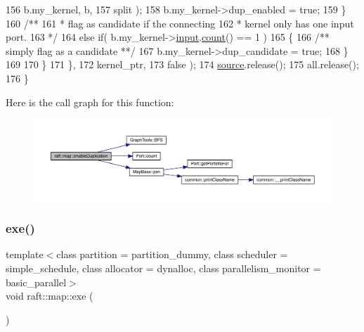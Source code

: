 \begin{DoxyCode}
156                                                b.my\_kernel, b,
157                                                split );
158                               b.my\_kernel->dup\_enabled = \textcolor{keyword}{true};
159                            \}\textcolor{comment}{}
160 \textcolor{comment}{                           /**}
161 \textcolor{comment}{                            * flag as candidate if the connecting}
162 \textcolor{comment}{                            * kernel only has one input port.}
163 \textcolor{comment}{                            */}
164                            \textcolor{keywordflow}{else} \textcolor{keywordflow}{if}( b.my\_kernel->\hyperlink{classraft_1_1kernel_a6edbe35a56409d402e719b3ac36d6554}{input}.\hyperlink{class_port_a33562ea87ac7e83a32441da40cbd9279}{count}() == 1 )
165                            \{\textcolor{comment}{}
166 \textcolor{comment}{                              /** simply flag as a candidate **/}
167                               b.my\_kernel->dup\_candidate = \textcolor{keyword}{true};
168                            \}
169 
170                         \}
171                      \},
172                      kernel\_ptr,
173                      false );
174    \hyperlink{classsource}{source}.release();
175    all.release();
176 \}
\end{DoxyCode}
Here is the call graph for this function\+:
\nopagebreak
\begin{figure}[H]
\begin{center}
\leavevmode
\includegraphics[width=350pt]{classraft_1_1map_a9eb65e50373f006fb193c203f8cab7d8_cgraph}
\end{center}
\end{figure}
\hypertarget{classraft_1_1map_a120b4bf6d1dcb186032e972878dd513d}{}\label{classraft_1_1map_a120b4bf6d1dcb186032e972878dd513d} 
\subsubsection{\texorpdfstring{exe()}{exe()}}
{\footnotesize\ttfamily template$<$class partition  = partition\+\_\+dummy, class scheduler  = simple\+\_\+schedule, class allocator  = dynalloc, class parallelism\+\_\+monitor  = basic\+\_\+parallel$>$ \\
void raft\+::map\+::exe (\begin{DoxyParamCaption}{ }\end{DoxyParamCaption})\hspace{0.3cm}{\ttfamily [inline]}}

